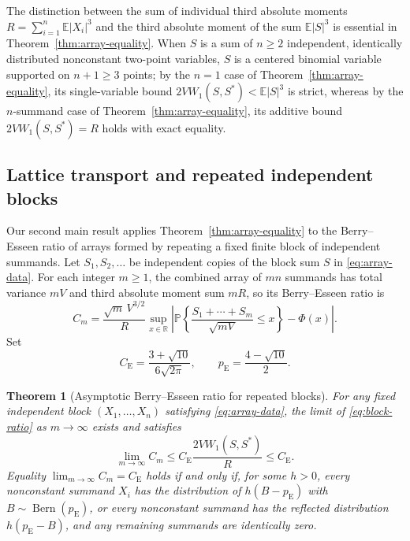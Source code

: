 \documentclass[11pt]{article}
\numberwithin{equation}{section}
\newtheorem{theorem}{Theorem}[section]
\theoremstyle{remark}
\DeclareMathOperator{\Bern}{Bern}
\newcommand{\E}{\mathbb E}
\newcommand{\Pp}{\mathbb P}
\newcommand{\R}{\mathbb R}
\newcommand{\ce}{C_{\mathrm E}}
\begin{document}
The distinction between the sum of individual third absolute moments
$R=\sum_{i=1}^n\E|X_i|^3$ and the third absolute moment of the sum $\E|S|^3$
is essential in Theorem~\ref{thm:array-equality}. When $S$ is a sum of
$n\ge2$ independent, identically distributed nonconstant two-point variables,
$S$ is a centered binomial variable supported on $n+1\ge3$ points; by the
$n=1$ case of Theorem~\ref{thm:array-equality}, its single-variable bound
$2VW_1(S,S^*)<\E|S|^3$ is strict, whereas by the $n$-summand case of
Theorem~\ref{thm:array-equality}, its additive bound $2VW_1(S,S^*)=R$ holds
with exact equality.

\subsection{Lattice transport and repeated independent blocks}

Our second main result applies Theorem~\ref{thm:array-equality} to the
Berry--Esseen ratio of arrays formed by repeating a fixed finite block of
independent summands. Let $S_1,S_2,\ldots$ be independent copies of the block
sum $S$ in \eqref{eq:array-data}. For each integer $m\ge1$, the combined
array of $mn$ summands has total variance $mV$ and third absolute moment sum
$mR$, so its Berry--Esseen ratio is
\begin{equation}\label{eq:block-ratio}
 C_m=\frac{\sqrt m\,V^{3/2}}{R}
 \sup_{x\in\R}\left|\Pp\left\{\frac{S_1+\cdots+S_m}{\sqrt{mV}}\le x\right\}
                   -\Phi(x)\right|.
\end{equation}
Set
\[
 \ce=\frac{3+\sqrt{10}}{6\sqrt{2\pi}},\qquad
 p_{\mathrm E}=\frac{4-\sqrt{10}}2.
\]

\begin{theorem}[Asymptotic Berry--Esseen ratio for repeated blocks]\label{thm:block}
For any fixed independent block $(X_1,\ldots,X_n)$ satisfying \eqref{eq:array-data},
the limit of \eqref{eq:block-ratio} as $m\to\infty$ exists and satisfies
\begin{equation}\label{eq:block-bound}
 \lim_{m\to\infty}C_m
 \le \ce\frac{2V W_1(S,S^*)}{R}\le\ce.
\end{equation}
Equality $\lim_{m\to\infty}C_m=\ce$ holds if and only if, for some $h>0$,
every nonconstant summand $X_i$ has the distribution of $h(B-p_{\mathrm E})$
with $B\sim\Bern(p_{\mathrm E})$, or every nonconstant summand has the
reflected distribution $h(p_{\mathrm E}-B)$, and any remaining summands are
identically zero.
\end{theorem}
\end{document}
